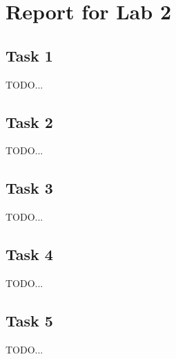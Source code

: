 \documentclass[a4paper, DIV12, headsepline]{scrartcl}
\begin{document}
\section*{Report for Lab 2}
\subsection*{Task 1}
TODO...


\subsection*{Task 2}
TODO...



\subsection*{Task 3}
TODO...

\subsection*{Task 4}
TODO...

\subsection*{Task 5}
TODO...
\end{document}
